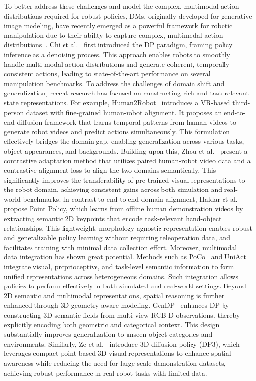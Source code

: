 \documentclass[final,5p,times,twocolumn]{elsarticle}
\begin{document}
To better address these challenges and model the complex, multimodal action distributions required for robust policies, DMs, originally developed for generative image modeling, have recently emerged as a powerful framework for robotic manipulation due to their ability to capture complex, multimodal action distributions~\cite{ZHANG2023149, firoozi2025foundation}. Chi et al.~\cite{chi2023diffusion} first introduced the DP paradigm, framing policy inference as a denoising process. This approach enables robots to smoothly handle multi-modal action distributions and generate coherent, temporally consistent actions, leading to state-of-the-art performance on several manipulation benchmarks. To address the challenges of domain shift and generalization, recent research has focused on constructing rich and task-relevant state representations. For example, Human2Robot~\cite{xie2025human2robot} introduces a VR-based third-person dataset with fine-grained human-robot alignment. It proposes an end-to-end diffusion framework that learns temporal patterns from human videos to generate robot videos and predict actions simultaneously. This formulation effectively bridges the domain gap, enabling generalization across various tasks, object appearances, and backgrounds. Building upon this, Zhou et al.~\cite{Mitigating2025} present a contrastive adaptation method that utilizes paired human-robot video data and a contrastive alignment loss to align the two domains semantically. This significantly improves the transferability of pre-trained visual representations to the robot domain, achieving consistent gains across both simulation and real-world benchmarks. In contrast to end-to-end domain alignment, Haldar et al.~\cite{haldar2025point} propose Point Policy, which learns from offline human demonstration videos by extracting semantic 2D keypoints that encode task-relevant hand-object relationships. This lightweight, morphology-agnostic representation enables robust and generalizable policy learning without requiring teleoperation data, and facilitates training with minimal data collection effort. Moreover, multimodal data integration has shown great potential. Methods such as PoCo~\cite{PoCo2024} and UniAct~\cite{UniAct2025} integrate visual, proprioceptive, and task-level semantic information to form unified representations across heterogeneous domains. Such integration allows policies to perform effectively in both simulated and real-world settings. Beyond 2D semantic and multimodal representations, spatial reasoning is further enhanced through 3D geometry-aware modeling. GenDP~\cite{GenDP2024} enhances DP by constructing 3D semantic fields from multi-view RGB-D observations, thereby explicitly encoding both geometric and categorical context. This design substantially improves generalization to unseen object categories and environments. Similarly, Ze et al.~\cite{Ze2024DP3} introduce 3D diffusion policy (DP3), which leverages compact point-based 3D visual representations to enhance spatial awareness while reducing the need for large-scale demonstration datasets, achieving robust performance in real-robot tasks with limited data.
\end{document}
